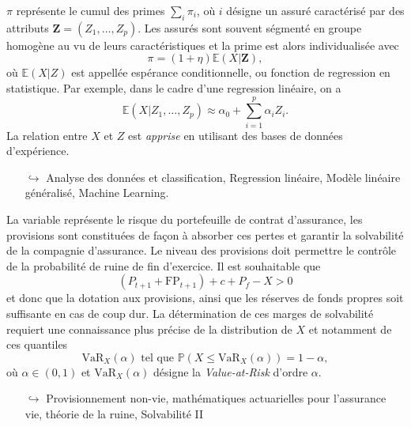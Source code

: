 \documentclass[8pt,notheorems]{beamer}
\theoremstyle{definition}
\theoremstyle{example}
\theoremstyle{mystyle}
\theoremstyle{plain}
\begin{document}
\begin{frame}[allowframebreaks]
$\pi$ représente le cumul des primes $\sum_i \pi_i$, où $i$ désigne un assuré caractérisé par des attributs $\mathbf{Z}= (Z_1,\ldots, Z_p)$. Les assurés sont souvent ségmenté en groupe homogène au vu de leurs caractéristiques et la prime est alors individualisée avec 
$$
\pi = (1+\eta)\mathbb{E}(X|\mathbf{Z}),
$$
où $\mathbb{E}(X|Z)$ est appellée espérance conditionnelle, ou fonction de regression en statistique. Par exemple, dans le cadre d'une regression linéaire, on a 
$$
\mathbb{E}(X|Z_1,\ldots, Z_p) \approx \alpha_0 +\sum_{i = 1}^{p}\alpha_i Z_i. 
$$
La relation entre $X$ et $Z$ est \textit{apprise} en utilisant des bases de données d'expérience.
\begin{itemize}
    \item[$\hookrightarrow$] Analyse des données et classification, Regression linéaire, Modèle linéaire généralisé, Machine Learning.
\end{itemize}   
\end{frame}
\begin{frame}[allowframebreaks]
La variable représente le risque du portefeuille de contrat d'assurance, les provisions sont constituées de façon à absorber ces pertes et garantir la solvabilité de la compagnie d'assurance. Le niveau des provisions doit permettre le contrôle de la probabilité de ruine de fin d'exercice. Il est souhaitable que 
$$
(P_{t+1}+\text{FP}_{t+1}) + c + P_f - X > 0
$$
et donc que la dotation aux provisions, ainsi que les réserves de fonds propres soit suffisante en cas de coup dur. La détermination de ces marges de solvabilité requiert une connaissance plus précise de la distribution de $X$ et notamment de ces quantiles 
$$
\text{VaR}_X(\alpha)\text{ tel que } \mathbb{P}(X\leq \text{VaR}_X(\alpha)) = 1- \alpha, 
$$
où $\alpha\in(0,1)$ et $\text{VaR}_X(\alpha)$ désigne la \textit{Value-at-Risk} d'ordre $\alpha$. 
\begin{itemize}
    \item[$\hookrightarrow$] Provisionnement non-vie, mathématiques actuarielles pour l'assurance vie, théorie de la ruine, Solvabilité II
\end{itemize}
\end{frame}
\end{document}
